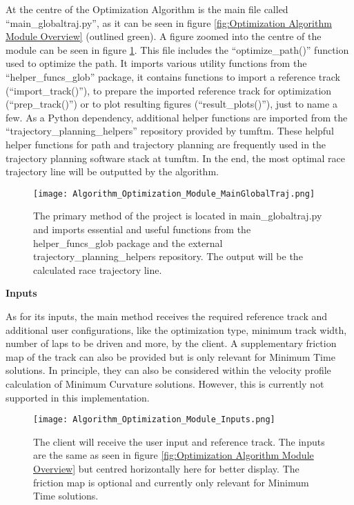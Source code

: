 At the centre of the Optimization Algorithm is the main file called ``main\_globaltraj.py'', as it can be seen in figure \ref{fig:Optimization Algorithm Module Overview} (outlined green). A figure zoomed into the centre of the module can be seen in figure \ref{fig:Optimization Algorithm Module MainGlobalTraj}. This file includes the ``optimize\_path()'' function used to optimize the path. It imports various utility functions from the ``helper\_funcs\_glob'' package, it contains functions to import a reference track (``import\_track()''), to prepare the imported reference track for optimization (``prep\_track()'') or to plot resulting figures (``result\_plots()''), just to name a few. As a Python dependency, additional helper functions are imported from the ``trajectory\_planning\_helpers'' repository provided by \acrshort{tumftm}. \cite{tumftm_trajectory_planning_helpers}
These helpful helper functions for path and trajectory planning are frequently used in the trajectory planning software stack at \acrshort{tumftm}.
In the end, the most optimal race trajectory line will be outputted by the algorithm.
\begin{figure}[H]
    \centering
    \texttt{[image: Algorithm\_Optimization\_Module\_MainGlobalTraj.png]}
    \caption{The primary method of the project is located in main\_globaltraj.py and imports essential and useful functions from the helper\_funcs\_glob package and the external trajectory\_planning\_helpers repository. The output will be the calculated race trajectory line.}
    \label{fig:Optimization Algorithm Module MainGlobalTraj}
\end{figure}

\textbf{Inputs}

As for its inputs, the main method receives the required reference track and additional user configurations, like the optimization type, minimum track width, number of laps to be driven and more, by the client. A supplementary friction map of the track can also be provided but is only relevant for Minimum Time solutions. In principle, they can also be considered within the velocity profile calculation of Minimum Curvature solutions. However, this is currently not supported in this implementation. \cite{tumftm_optimization_algoritm}
\begin{figure}[H]
    \centering
    \texttt{[image: Algorithm\_Optimization\_Module\_Inputs.png]}
    \caption{The client will receive the user input and reference track. The inputs are the same as seen in figure \ref{fig:Optimization Algorithm Module Overview} but centred horizontally here for better display. The friction map is optional and currently only relevant for Minimum Time solutions.}
    \label{fig:Optimization Algorithm Module Inputs}
\end{figure}

